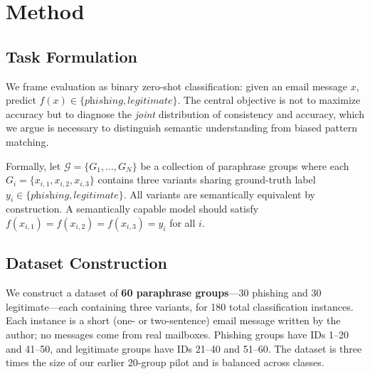 \documentclass[11pt]{article}
\begin{document}
\section{Method}

\subsection{Task Formulation}

We frame evaluation as binary zero-shot classification: given an email message $x$, predict $f(x) \in \{\textit{phishing}, \textit{legitimate}\}$. The central objective is not to maximize accuracy but to diagnose the \textit{joint} distribution of consistency and accuracy, which we argue is necessary to distinguish semantic understanding from biased pattern matching.

Formally, let $\mathcal{G} = \{G_1, \ldots, G_N\}$ be a collection of paraphrase groups where each $G_i = \{x_{i,1}, x_{i,2}, x_{i,3}\}$ contains three variants sharing ground-truth label $y_i \in \{\textit{phishing}, \textit{legitimate}\}$. All variants are semantically equivalent by construction. A semantically capable model should satisfy $f(x_{i,1}) = f(x_{i,2}) = f(x_{i,3}) = y_i$ for all $i$.

\subsection{Dataset Construction}

We construct a dataset of \textbf{60 paraphrase groups}---30 phishing and 30 legitimate---each containing three variants, for 180 total classification instances. Each instance is a short (one- or two-sentence) email message written by the author; no messages come from real mailboxes. Phishing groups have IDs 1--20 and 41--50, and legitimate groups have IDs 21--40 and 51--60. The dataset is three times the size of our earlier 20-group pilot and is balanced across classes.
\end{document}
